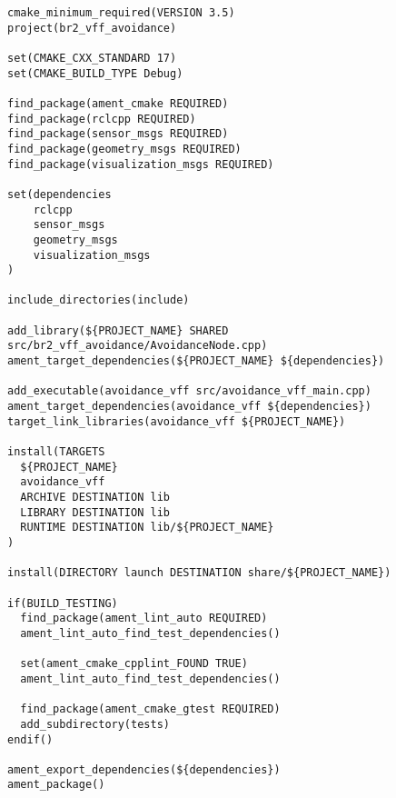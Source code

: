  \footnotesize
\begin{tcolorbox}[sharp corners, colframe=gray!80, colback=LightGray, left=0pt, top=0pt, bottom=0pt, title=\texttt{br2\_vff\_avoidance/CMakeLists.txt}]
  \begin{verbatim}
cmake_minimum_required(VERSION 3.5)
project(br2_vff_avoidance)

set(CMAKE_CXX_STANDARD 17)
set(CMAKE_BUILD_TYPE Debug)

find_package(ament_cmake REQUIRED)
find_package(rclcpp REQUIRED)
find_package(sensor_msgs REQUIRED)
find_package(geometry_msgs REQUIRED)
find_package(visualization_msgs REQUIRED)

set(dependencies
    rclcpp
    sensor_msgs
    geometry_msgs
    visualization_msgs
)

include_directories(include)

add_library(${PROJECT_NAME} SHARED src/br2_vff_avoidance/AvoidanceNode.cpp)
ament_target_dependencies(${PROJECT_NAME} ${dependencies})

add_executable(avoidance_vff src/avoidance_vff_main.cpp)
ament_target_dependencies(avoidance_vff ${dependencies})
target_link_libraries(avoidance_vff ${PROJECT_NAME})

install(TARGETS
  ${PROJECT_NAME}
  avoidance_vff
  ARCHIVE DESTINATION lib
  LIBRARY DESTINATION lib
  RUNTIME DESTINATION lib/${PROJECT_NAME}
)

install(DIRECTORY launch DESTINATION share/${PROJECT_NAME})

if(BUILD_TESTING)
  find_package(ament_lint_auto REQUIRED)
  ament_lint_auto_find_test_dependencies()

  set(ament_cmake_cpplint_FOUND TRUE)
  ament_lint_auto_find_test_dependencies()

  find_package(ament_cmake_gtest REQUIRED)
  add_subdirectory(tests)
endif()

ament_export_dependencies(${dependencies})
ament_package()
    \end{verbatim}
    \end{tcolorbox}
  \normalsize

